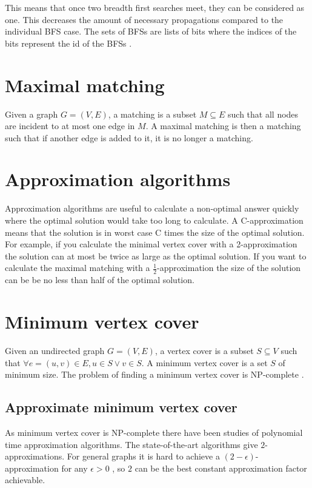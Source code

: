 This means that once two breadth first searches meet, they can be considered as one. This decreases the amount of necessary propagations compared to the individual BFS case. The sets of BFSs are lists of bits where the indices of the bits represent the id of the BFSs \cite{msbfs}.

\section{Maximal matching}
Given a graph $G = (V,E)$, a matching is a subset $M \subseteq E$ such that all nodes are incident to at most one edge in $M$. A maximal matching is then a matching such that if another edge is added to it, it is no longer a matching. 

\section{Approximation algorithms}
Approximation algorithms are useful to calculate a non-optimal answer quickly where the optimal solution would take too long to calculate. A C-approximation means that the solution is in worst case C times the size of the optimal solution. For example, if you calculate the minimal vertex cover with a 2-approximation the solution can at most be twice as large as the optimal solution. If you want to calculate the maximal matching with a $\frac{1}{2}$-approximation the size of the solution can be be no less than half of the optimal solution.

\section{Minimum vertex cover}
Given an undirected graph $G = (V,E)$, a vertex cover is a subset $S \subseteq V$ such that $\forall e = (u,v) \in E,  u \in S \vee v \in S$. A minimum vertex cover is a set $S$ of minimum size. The problem of finding a minimum vertex cover is NP-complete \cite{Kar72}.

\subsection{Approximate minimum vertex cover}
As minimum vertex cover is NP-complete there have been studies of polynomial time approximation algorithms. The state-of-the-art algorithms give $2$-approximations. For general graphs it is hard to achieve a $(2-\epsilon)$-approximation for any $\epsilon > 0$ \cite{2-evchard}, so $2$ can be the best constant approximation factor achievable.

